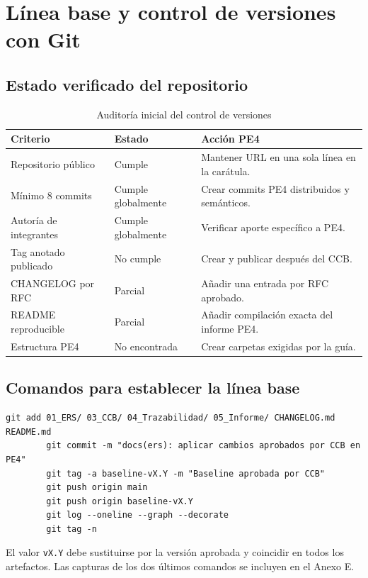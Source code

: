 \documentclass[11pt,a4paper]{article}
\begin{document}
	\section{Línea base y control de versiones con Git}
	\subsection{Estado verificado del repositorio}

	
	\begin{table}[H]
		\centering
		\caption{Auditoría inicial del control de versiones}
		\begin{tabularx}{\textwidth}{p{5.0cm}p{2.8cm}X}
			\toprule
			\textbf{Criterio} & \textbf{Estado} & \textbf{Acción PE4}\\
			\midrule
			Repositorio público & Cumple & Mantener URL en una sola línea en la carátula.\\
			Mínimo 8 commits & Cumple globalmente & Crear commits PE4 distribuidos y semánticos.\\
			Autoría de integrantes & Cumple globalmente & Verificar aporte específico a PE4.\\
			Tag anotado publicado & No cumple & Crear y publicar después del CCB.\\
			CHANGELOG por RFC & Parcial & Añadir una entrada por RFC aprobado.\\
			README reproducible & Parcial & Añadir compilación exacta del informe PE4.\\
			Estructura PE4 & No encontrada & Crear carpetas exigidas por la guía.\\
			\bottomrule
		\end{tabularx}
	\end{table}
	
	\subsection{Comandos para establecer la línea base}
	\begin{lstlisting}[style=terminal]
		git add 01_ERS/ 03_CCB/ 04_Trazabilidad/ 05_Informe/ CHANGELOG.md README.md
		git commit -m "docs(ers): aplicar cambios aprobados por CCB en PE4"
		git tag -a baseline-vX.Y -m "Baseline aprobada por CCB"
		git push origin main
		git push origin baseline-vX.Y
		git log --oneline --graph --decorate
		git tag -n
	\end{lstlisting}
	El valor \texttt{vX.Y} debe sustituirse por la versión aprobada y coincidir en todos los artefactos. Las capturas de los dos últimos comandos se incluyen en el Anexo E.
	
\end{document}
